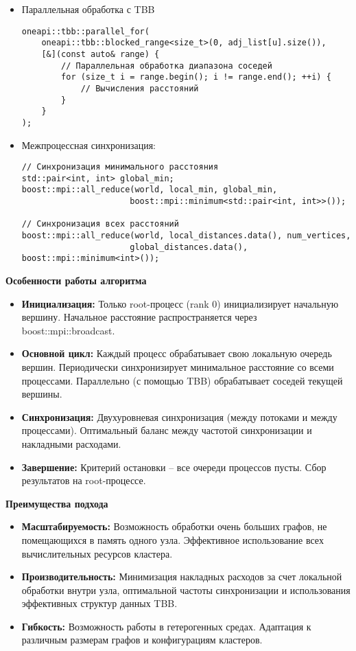 \documentclass[12pt]{article}
\begin{document}
\begin{itemize}
\item Параллельная обработка с TBB

\begin{verbatim}
oneapi::tbb::parallel_for(
    oneapi::tbb::blocked_range<size_t>(0, adj_list[u].size()),
    [&](const auto& range) {
        // Параллельная обработка диапазона соседей
        for (size_t i = range.begin(); i != range.end(); ++i) {
            // Вычисления расстояний
        }
    }
);
\end{verbatim}

\item Межпроцессная синхронизация:
\begin{verbatim}
// Синхронизация минимального расстояния
std::pair<int, int> global_min;
boost::mpi::all_reduce(world, local_min, global_min, 
                      boost::mpi::minimum<std::pair<int, int>>());

// Синхронизация всех расстояний
boost::mpi::all_reduce(world, local_distances.data(), num_vertices,
                      global_distances.data(), boost::mpi::minimum<int>());
\end{verbatim}
\end{itemize}
\textbf{Особенности работы алгоритма}
\begin{itemize}
    \item \textbf{Инициализация:} Только root-процесс (rank 0) инициализирует начальную вершину. Начальное расстояние распространяется через boost::mpi::broadcast.
    \item \textbf{Основной цикл:} Каждый процесс обрабатывает свою локальную очередь вершин. Периодически синхронизирует минимальное расстояние со всеми процессами. Параллельно (с помощью TBB) обрабатывает соседей текущей вершины.
    \item \textbf{Синхронизация:} Двухуровневая синхронизация (между потоками и между процессами). Оптимальный баланс между частотой синхронизации и накладными расходами.
    \item \textbf{Завершение:} Критерий остановки – все очереди процессов пусты. Сбор результатов на root-процессе.
\end{itemize}


\textbf{Преимущества подхода}

\begin{itemize}
    \item \textbf{Масштабируемость:} Возможность обработки очень больших графов, не помещающихся в память одного узла. Эффективное использование всех вычислительных ресурсов кластера.
    \item \textbf{Производительность:} Минимизация накладных расходов за счет локальной обработки внутри узла, оптимальной частоты синхронизации и использования эффективных структур данных TBB.
    \item \textbf{Гибкость:} Возможность работы в гетерогенных средах. Адаптация к различным размерам графов и конфигурациям кластеров.
\end{itemize}
\end{document}

